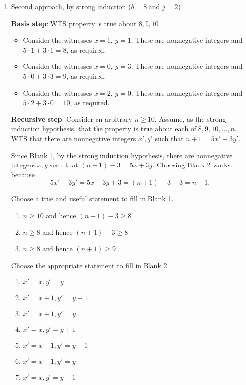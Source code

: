 \begin{enumerate}
\item  Second approach, by strong induction ($b=8$ and $j=2$)

{\bf Basis step}:  WTS property is true about  $8, 9, 10$
\begin{itemize}
\item Consider the witnesses $x = 1$, $y=1$. These 
are nonnegative integers and $5 \cdot 1 + 3 \cdot 1 = 8$, as
required.
\item Consider the witnesses $x = 0$, $y=3$. These 
are nonnegative integers and $5 \cdot 0 + 3 \cdot 3 = 9$, as
required.
\item Consider the witnesses $x = 2$, $y=0$. These 
are nonnegative integers and $5 \cdot 2 + 3 \cdot 0 = 10$, as
required.
\end{itemize}

{\bf Recursive step}: Consider an  arbitrary  $n \geq 10$.
Assume, as the strong induction hypothesis, 
that the property is true about each of $8, 9, 10, \ldots, n$.  
WTS
that there are nonnegative integers $x', y'$ such
that  $n+1 = 5x' +  3y'$. 

Since \underline{Blank 1}, 
by the strong induction hypothesis, there are nonnegative integers
$x, y$ such that $(n+1) - 3 = 5x + 3y$.
Choosing \underline{Blank 2} works because
\[
    5x' + 3y' = 5x + 3y + 3 = (n+1) - 3 + 3 = n+1.
\]

Choose a true and useful statement to fill in Blank 1.
    \begin{enumerate}
        \item $n \geq 10$ and hence $(n+1) - 3 \geq 8$
        \item $n \geq 8$ and hence $(n+1)-3 \geq 8$
        \item $n \geq 8$ and hence $(n+1) \geq 9$
    \end{enumerate}

Choose the appropriate statement to fill in Blank 2.
    \begin{enumerate}
        \item $x' = x, y' = y$
        \item $x' = x+1, y' = y+1$
        \item $x' = x+1, y' = y$
        \item $x' = x, y' = y+1$
        \item $x' = x-1, y' = y-1$
        \item $x' = x-1, y' = y$
        \item $x' = x, y' = y-1$
    \end{enumerate}
\end{enumerate}
